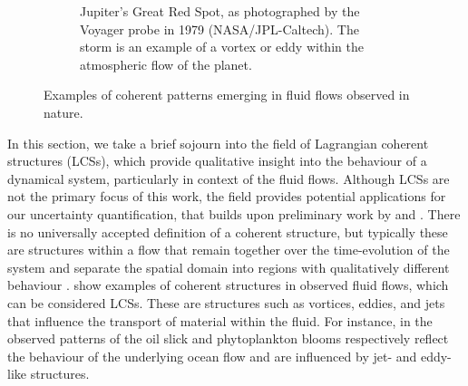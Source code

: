 \begin{figure}
\begin{center}
\begin{subfigure}[t]{\textwidth}
			\caption{Jupiter's Great Red Spot, as photographed by the Voyager probe in 1979 (NASA/JPL-Caltech).
				The storm is an example of a vortex or eddy within the atmospheric flow of the planet.}
		\end{subfigure}
		\caption{Examples of coherent patterns emerging in fluid flows observed in nature.}
		\label{fig:lcs_examples}
	\end{center}
\end{figure}

In this section, we take a brief sojourn into the field of Lagrangian coherent structures (LCSs), which provide qualitative insight into the behaviour of a dynamical system, particularly in context of the fluid flows.
Although LCSs are not the primary focus of this work, the field provides potential applications for our uncertainty quantification, that builds upon preliminary work by \citet{Balasuriya_2020_StochasticSensitivityComputable,Balasuriya_2020_UncertaintyFinitetimeLyapunov} and \citet{BadzaEtAl_2023_HowSensitiveAre}.
There is no universally accepted definition of a coherent structure, but typically these are structures within a flow that remain together over the time-evolution of the system and separate the spatial domain into regions with qualitatively different behaviour \citep{BalasuriyaEtAl_2018_GeneralizedLagrangianCoherent}.
 show examples of coherent structures in observed fluid flows, which can be considered LCSs.
These are structures such as vortices, eddies, and jets that influence the transport of material within the fluid.
For instance, in  the observed patterns of the oil slick and phytoplankton blooms respectively reflect the behaviour of the underlying ocean flow and are influenced by jet- and eddy-like structures.


